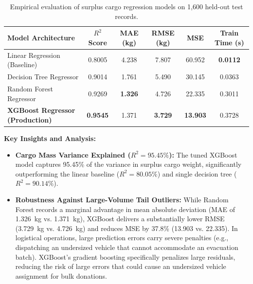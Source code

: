 \documentclass[12pt,a4paper]{article}
\renewcommand{\_}{\oldunderscore\allowbreak}
\begin{document}
\begin{table}[H]
\centering
\caption{Empirical evaluation of surplus cargo regression models on 1,600 held-out test records.}
\label{tab:cargo_regression_benchmark}
\renewcommand{\arraystretch}{1.15}
\setlength{\tabcolsep}{5.5pt}
{\footnotesize
\begin{tabular}{@{} l c c c c c @{}}
\toprule
\rowcolor{NavyPrimary}
\color{white}\textbf{Model Architecture} & \color{white}\textbf{$R^2$ Score} & \color{white}\textbf{MAE (kg)} & \color{white}\textbf{RMSE (kg)} & \color{white}\textbf{MSE} & \color{white}\textbf{Train Time (s)} \\
\midrule
Linear Regression (Baseline) & 0.8005 & 4.238 & 7.807 & 60.952 & \textbf{0.0112} \\
\rowcolor{LightBg}
Decision Tree Regressor & 0.9014 & 1.761 & 5.490 & 30.145 & 0.0363 \\
Random Forest Regressor & 0.9269 & \textbf{1.326} & 4.726 & 22.335 & 0.3011 \\
\rowcolor{LightBg}
\textbf{XGBoost Regressor (Production)} & \textbf{0.9545} & 1.371 & \textbf{3.729} & \textbf{13.903} & 0.3728 \\
\bottomrule
\end{tabular}}
\end{table}

\textbf{Key Insights and Analysis:}
\begin{itemize}[leftmargin=18pt, itemsep=2pt]
    \item \textbf{Cargo Mass Variance Explained ($R^2 = 95.45\%$):} The tuned XGBoost model captures 95.45\% of the variance in surplus cargo weight, significantly outperforming the linear baseline ($R^2 = 80.05\%$) and single decision tree ($R^2 = 90.14\%$).
    \item \textbf{Robustness Against Large-Volume Tail Outliers:} While Random Forest records a marginal advantage in mean absolute deviation (MAE of 1.326~kg vs. 1.371~kg), XGBoost delivers a substantially lower RMSE (3.729~kg vs. 4.726~kg) and reduces MSE by 37.8\% (13.903 vs. 22.335). In logistical operations, large prediction errors carry severe penalties (e.g., dispatching an undersized vehicle that cannot accommodate an evacuation batch). XGBoost's gradient boosting specifically penalizes large residuals, reducing the risk of large errors that could cause an undersized vehicle assignment for bulk donations.
\end{itemize}

\end{document}
